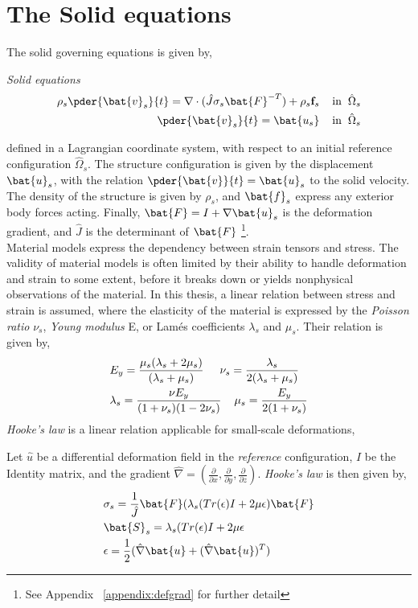 \section{The Solid equations}
\label{sec:solprob}
The solid governing equations is given by, 
\begin{equat}
\textit{Solid equations}
\begin{align}
\rho_s \pder{\bat{v}_s}{t} = \nabla \cdot ( \hat{J} \sigma_s \bat{F}^{-T})  + \rho_s \mathbf{f}_s
\hspace{4mm} \text{in} \hspace{2mm} \hat{\Omega}_s \\
\pder{\bat{v}_s}{t} = \bat{u_s} \hspace{4mm} \text{in} \hspace{2mm}  \hat{\Omega}_s
\end{align}
\end{equat}
defined in a Lagrangian coordinate system, with respect to an initial reference configuration $\hat{\Omega}_s$. The structure configuration is given by the displacement $\bat{u}_s$, with the relation $\pder{\bat{v}}{t} = \bat{u}_s$ to the solid velocity. The density of the structure is given by $\rho_s$, and $\bat{f}_s$ express any exterior body forces acting. Finally, $\bat{F} = I + \nabla \bat{u}_s$ is the deformation gradient, and $\hat{J}$ is the determinant of $\bat{F}$ \footnote{See Appendix ~\ref{appendix:defgrad}  for further detail}. \\
Material models express the dependency between strain tensors and stress. The validity of material models is often limited by their ability to handle deformation and strain to some extent, before it breaks down or yields nonphysical observations of the material. In this thesis, a linear relation between stress and strain is assumed, where the elasticity of the material is expressed by the \textit{Poisson ratio} $\nu_s$, \textit{Young modulus} E, or Lamés coefficients  $\lambda_s$ and $\mu_s$. Their relation is given by,
\begin{align*}
&E_y = \frac{ \mu_s ( \lambda_s + 2 \mu_s) }{ ( \lambda_s + \mu_s ) } 
\hspace{5mm} \nu_s = \frac{\lambda_s}{2(\lambda_s + \mu_s)} \\
&\lambda_s = \frac{\nu E_y}{(1 + \nu_s)(1 - 2\nu_s)} \hspace{4mm} \mu_s = \frac{E_y}{2(1 + \nu_s)} 
\end{align*}
\textit{Hooke's law} is a linear relation applicable for small-scale deformations,
\begin{defn}
Let $\hat{u}$ be a differential deformation field in the \textit{reference} configuration, $I$ be the Identity matrix, and the gradient $\hat{\nabla} = (\frac{\partial}{\partial x}, \frac{\partial}{\partial y}, \frac{\partial}{\partial z}) $. \textit{Hooke's law} is then given by,
\begin{align*}
&\sigma_s = \frac{1}{\hat{J}} \bat{F}(\lambda_s(Tr(\epsilon) I + 2 \mu  \epsilon)\bat{F} \\
&\bat{S}_s = \lambda_s(Tr(\epsilon) I + 2 \mu \epsilon \\
&\epsilon = \frac{1}{2}(\hat{\nabla} \bat{u} + (\hat{\nabla} \bat{u})^T ) 
\end{align*} 
\end{defn}
